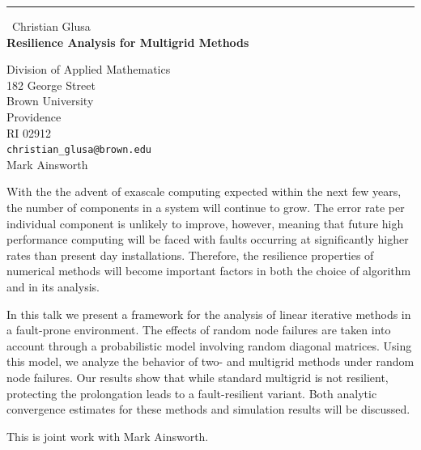 \documentclass{report}
\begin{document}
\begin{center}
\rule{6in}{1pt} \
{\large Christian Glusa \\
{\bf Resilience Analysis for Multigrid Methods}}

Division of Applied Mathematics \\ 182 George Street \\ Brown University \\ Providence \\ RI 02912
\\
{\tt christian\_glusa@brown.edu}\\
Mark Ainsworth\end{center}

With the the advent of exascale computing expected within the next few
years, the number of components in a system will continue to grow. The
error rate per individual component is unlikely to improve, however,
meaning that future high performance computing will be faced with faults
occurring at significantly higher rates than present day installations.
Therefore, the resilience properties of numerical methods will become
important factors in both the choice of algorithm and in its analysis.

In this talk we present a framework for the analysis of linear iterative
methods in a fault-prone environment. The effects of random node failures
are taken into account through a probabilistic model involving random
diagonal matrices. Using this model, we analyze the behavior of two- and
multigrid methods under random node failures. Our results show that while
standard multigrid is not resilient, protecting the prolongation leads to
a fault-resilient variant. Both analytic convergence estimates for these
methods and simulation results will be discussed.

This is joint work with Mark Ainsworth.
\end{document}
